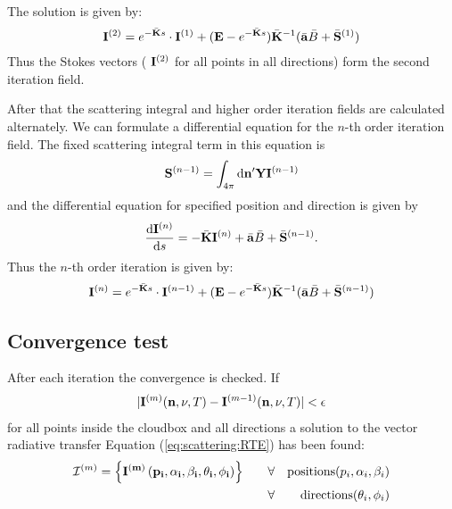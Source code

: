 The solution is given by:
\begin{eqnarray}
   {\bf I}^{(2)} = e^{-\bar{{\bf K}} s}\cdot{\bf I}^{(1)} + ({\bf E} - e^{-\bar{{\bf K}}
    s}) \bar{{\bf K}}^{-1} (\bar{{\bf a}} \bar{B} + \bar{{\bf S}}^{(1)})
\end{eqnarray}
Thus the Stokes vectors ( ${\bf I}^{(2)}$ for all points in all
directions) form the second iteration field.

After that the scattering integral and higher order iteration fields
are calculated alternately. We can formulate a differential equation
for the $n$-th order iteration field. The fixed scattering integral
term in this equation is
 \begin{eqnarray}
  {\bf S}^{(n-1)} = \int_{4\pi} \mathrm{d} {\bf n}^\prime
  {\bf Y} {\bf I}^{(n-1)}
\end{eqnarray}
and the differential equation for specified position and direction is
given by
\begin{eqnarray}
     \frac{\mathrm{d} {\bf I}^{(n)}}{\mathrm{d} s} =
     -\bar{{\bf K}} {\bf I}^{(n)} + \bar{{\bf a}} \bar{B}
     +\bar{{\bf S}}^{(n-1)}.
\end{eqnarray} 
Thus the $n$-th order iteration is given by:
\begin{eqnarray}
   {\bf I}^{(n)} = e^{-\bar{{\bf K}} s}\cdot{\bf I}^{(n-1)} + ({\bf E} - e^{-\bar{{\bf K}}
    s}) \bar{{\bf K}}^{-1} (\bar{{\bf a}} \bar{B} + \bar{{\bf S}}^{(n-1)})
\end{eqnarray}


\subsection{Convergence test}

After each iteration the convergence is checked. If
\begin{eqnarray}
|{\bf I}^{(m)} ({\bf n}, \nu, T) -  {\bf I}^{(m-1)} ({\bf n}, \nu, T)| < {\bf \epsilon}
\end{eqnarray}
for all points inside the cloudbox and all directions a solution to
the vector radiative transfer Equation (\ref{eq:scattering:RTE}) has
been found:
\begin{eqnarray}
{\mathcal I}^{(m)} = \left\{ \bf{I}^{(m)} \left( p_i, \alpha_i, \beta_i, \theta_i, \phi_i\right)\right\}  \qquad  
&\forall& {\rm positions } (p_i,\alpha_i, \beta_i)\\
&\forall& {\rm directions } (\theta_i,\phi_i)
\end{eqnarray}



